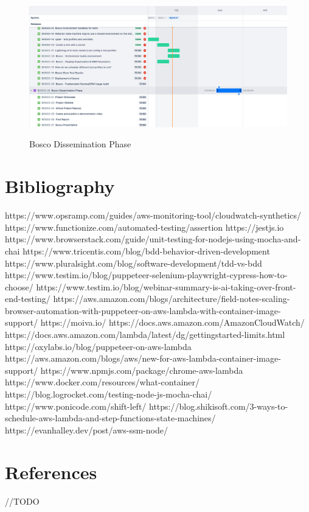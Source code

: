 \documentclass[12pt,a4paper,titlepage]{report}
\begin{document}
\begin{figure}[ht]
  \centering
  {\includegraphics[width=15cm]{./diagrams/sprints2.png}}
  \caption{Bosco Dissemination Phase}
\end{figure}

\chapter{Bibliography}

https://www.opsramp.com/guides/aws-monitoring-tool/cloudwatch-synthetics/
https://www.functionize.com/automated-testing/assertion
https://jestjs.io
https://www.browserstack.com/guide/unit-testing-for-nodejs-using-mocha-and-chai
https://www.tricentis.com/blog/bdd-behavior-driven-development
https://www.pluralsight.com/blog/software-development/tdd-vs-bdd
https://www.testim.io/blog/puppeteer-selenium-playwright-cypress-how-to-choose/
https://www.testim.io/blog/webinar-summary-is-ai-taking-over-front-end-testing/
https://aws.amazon.com/blogs/architecture/field-notes-scaling-browser-automation-with-puppeteer-on-aws-lambda-with-container-image-support/
https://moiva.io/
https://docs.aws.amazon.com/AmazonCloudWatch/
https://docs.aws.amazon.com/lambda/latest/dg/gettingstarted-limits.html
https://oxylabs.io/blog/puppeteer-on-aws-lambda
https://aws.amazon.com/blogs/aws/new-for-aws-lambda-container-image-support/
https://www.npmjs.com/package/chrome-aws-lambda
https://www.docker.com/resources/what-container/
https://blog.logrocket.com/testing-node-js-mocha-chai/
https://www.ponicode.com/shift-left/
https://blog.shikisoft.com/3-ways-to-schedule-aws-lambda-and-step-functions-state-machines/
https://evanhalley.dev/post/aws-ssm-node/

\chapter{References}
//TODO
\end{document}
